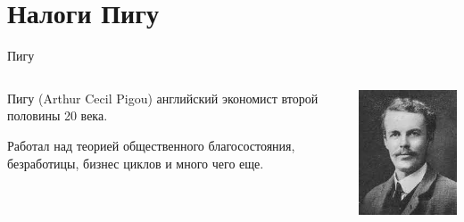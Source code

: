 \documentclass{beamer}
\begin{document}
\section{Налоги Пигу}

\begin{frame}{Пигу}

\begin{columns}
\begin{column}{0.5\textwidth}
   \alert{Пигу} (Arthur Cecil Pigou) английский экономист второй половины 20 века. 
   
   Работал над теорией общественного благосостояния, безработицы, бизнес циклов и много чего еще.
\end{column}
\begin{column}{0.5\textwidth}  %
    \begin{center}
     \includegraphics[width=1\textwidth]{pigou}
     \end{center}
\end{column}
\end{columns}

\end{frame}
\end{document}
